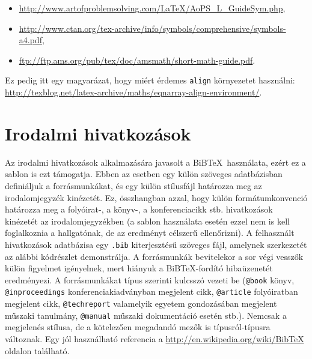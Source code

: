 \documentclass[11pt,magyar,a4paper,oneside,]{report}
\begin{document}
\begin{itemize}
\itemsep1pt\parskip0pt
\item
  \url{http://www.artofproblemsolving.com/LaTeX/AoPS_L_GuideSym.php},
\item
  \url{http://www.ctan.org/tex-archive/info/symbols/comprehensive/symbols-a4.pdf},
\item
  \url{ftp://ftp.ams.org/pub/tex/doc/amsmath/short-math-guide.pdf}.
\end{itemize}

Ez pedig itt egy magyarázat, hogy miért érdemes \texttt{align}
környezetet használni:
\url{http://texblog.net/latex-archive/maths/eqnarray-align-environment/}.

\section{Irodalmi hivatkozások}\label{irodalmi-hivatkozuxe1sok}

Az irodalmi hivatkozások alkalmazására javasolt a BiB\TeX~használata,
ezért ez a sablon is ezt támogatja. Ebben az esetben egy külön szöveges
adatbázisban definiáljuk a forrásmunkákat, és egy külön stílusfájl
határozza meg az irodalomjegyzék kinézetét. Ez, összhangban azzal, hogy
külön formátumkonvenció határozza meg a folyóirat-, a könyv-, a
konferenciacikk stb. hivatkozások kinézetét az irodalomjegyzékben (a
sablon használata esetén ezzel nem is kell foglalkoznia a hallgatónak,
de az eredményt célszerű ellenőrizni). A felhasznált hivatkozások
adatbázisa egy \texttt{.bib} kiterjesztésű szöveges fájl, amelynek
szerkezetét az alábbi kódrészlet demonstrálja. A forrásmunkák
bevitelekor a sor végi vesszők külön figyelmet igényelnek, mert hiányuk
a BiB\TeX-fordító hibaüzenetét eredményezi. A forrásmunkákat típus
szerinti kulcsszó vezeti be (\texttt{@book} könyv,
\texttt{@inproceedings} konferenciakiadványban megjelent cikk,
\texttt{@article} folyóiratban megjelent cikk, \texttt{@techreport}
valamelyik egyetem gondozásában megjelent műszaki tanulmány,
\texttt{@manual} műszaki dokumentáció esetén stb.). Nemcsak a megjelenés
stílusa, de a kötelezően megadandó mezők is típusról-típusra változnak.
Egy jól használható referencia a
\url{http://en.wikipedia.org/wiki/BibTeX} oldalon található.
\end{document}
